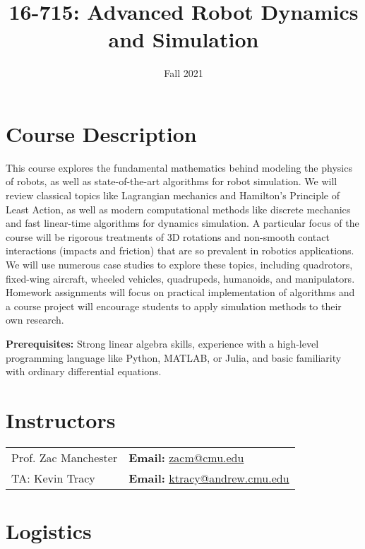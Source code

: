 \documentclass[11pt,letterpaper]{article}
\title{16-715: Advanced Robot Dynamics and Simulation}
\author{Fall 2021}
\date{}
\begin{document}
\maketitle

\section*{Course Description}

This course explores the fundamental mathematics behind modeling the physics of robots, as well as state-of-the-art algorithms for robot simulation. We will review classical topics like Lagrangian mechanics and Hamilton's Principle of Least Action, as well as modern computational methods like discrete mechanics and fast linear-time algorithms for dynamics simulation. A particular focus of the course will be rigorous treatments of 3D rotations and non-smooth contact interactions (impacts and friction) that are so prevalent in robotics applications. We will use numerous case studies to explore these topics, including quadrotors, fixed-wing aircraft, wheeled vehicles, quadrupeds, humanoids, and manipulators. Homework assignments will focus on practical implementation of algorithms and a course project will encourage students to apply simulation methods to their own research.

\medskip
\noindent
\textbf{Prerequisites:} Strong linear algebra skills, experience with a high-level programming language like Python, MATLAB, or Julia, and basic familiarity with ordinary differential equations.

\section*{Instructors}

\begin{center}
\begin{tabular}{l l}
	Prof. Zac Manchester & \textbf{Email:} \href{mailto:zacm@cmu.edu}{zacm@cmu.edu} \\
	TA: Kevin Tracy & \textbf{Email:} \href{mailto:ktracy.cmu.edu}{ktracy@andrew.cmu.edu}
\end{tabular}
\end{center}

\section*{Logistics}
\end{document}
